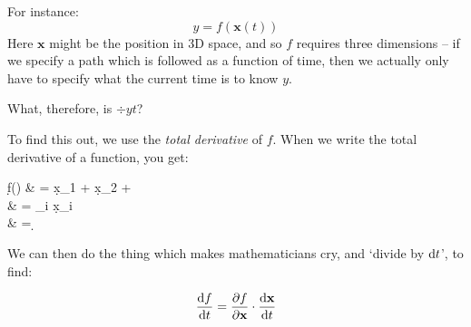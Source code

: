 \documentclass[a4paper,openany,11pt]{book}
\renewcommand\vec[1]{\boldsymbol{\mathbf{#1}}}
\begin{document}
			For instance:
			\begin{equation}
				y = f(\vec{x}(t))
			\end{equation}
			Here $\vec{x}$ might be the position in 3D space, and so $f$ requires three dimensions -- if we specify a path which is followed as a function of time, then we actually only have to specify what the current time is to know $y$. 

			What, therefore, is $\div{y}{t}$?

			To find this out, we use the \textit{total derivative} of $f$. When we write the total derivative of a function, you get:

			\begin{spalign}
				\d f(\vec{x}) & =  \d x_1 +  \d x_2 + \hdots 
					\\	 
					& = \sum_i  \d x_i
					\\
					& = \pdiv{f}{\vec{x}} \cdot \d \vec{x}
			\end{spalign}
			We can then do the thing which makes mathematicians cry, and `divide by $\mathrm d t$', to find:

			\begin{equation}
				\div{f}{t} = \pdiv{f}{\vec{x}} \cdot \div{\vec{x}}{t}
			\end{equation}


\end{document}

